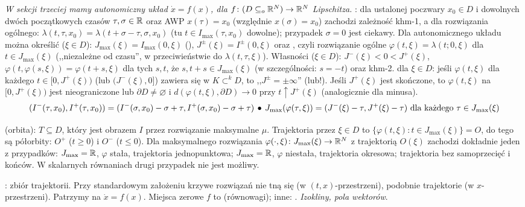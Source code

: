 \emph{W sekcji  trzeciej mamy autonomiczny układ $\dot x = f(x)$, dla $f \colon (D \subseteq_o \mathbb{R}^N) \to \mathbb{R}^N$ Lipschitza.}
: dla ustalonej poczwary $x_0 \in D$ i dowolnych dwóch początkowych czasów $\tau, \sigma \in \mathbb{R}$ oraz AWP $x(\tau) = x_0$ (względnie $x(\sigma) = x_0$) zachodzi zależność khm-1, a dla rozwiązania ogólnego: $\lambda(t, \tau, x_0) = \lambda(t+ \sigma- \tau, \sigma, x_0)$ (tu $t \in I_{\max}(\tau, x_0)$ dowolne); przypadek $\sigma = 0$ jest ciekawy.
Dla autonomicznego układu można określić ($\xi \in D$): $J_{\max}(\xi) = I_{\max}(0, \xi)$ (), $J^\pm(\xi) = I^\pm(0,\xi)$ oraz , czyli rozwiązanie ogólne $\varphi(t, \xi) = \lambda(t; 0, \xi)$ dla $t \in J_{\max}(\xi)$ (,,niezależne od czasu'', w przeciwieństwie do  $\lambda(t, \tau, \xi)$).
Własności ($\xi \in D$): $J^-(\xi) < 0 < J^+(\xi)$, $\varphi(t, \varphi(s, \xi)) = \varphi(t+s, \xi)$ dla tych $s, t$, że $s, t+s \in J_{\max}(\xi)$ (w szczególności: $s = -t$) oraz khm-2.
 dla $\xi \in D$:
jeśli $\varphi(t, \xi)$ dla każdego $t\in [0, J^+(\xi))$ (lub $(J^-(\xi), 0]$) zawiera się w $K \subset^k D$, to ,,$J^\pm=\pm \infty$'' (lub!).
Jeśli $J^+(\xi)$ jest skończone, to $\varphi(t, \xi)$ na $[0, J^+(\xi))$ jest nieograniczone lub $\partial D \neq \varnothing$ i $d(\varphi(t, \xi), \partial D) \to 0$ przy $t \uparrow J^+(\xi)$ (analogicznie dla minusa).
\[
	(I^-(\tau, x_0), I^+(\tau, x_0)) = (I^-(\sigma, x_0) - \sigma+\tau, I^+(\sigma, x_0)-  \sigma + \tau) \, \bullet \,
	J_{\max}(\varphi(\tau, \xi)) = (J^-(\xi) - \tau, J^+(\xi) - \tau) \textrm{ dla każdego } \tau \in J_{\max}(\xi)
\]

 (orbita):  $T \subseteq D$, który jest obrazem $I$ przez rozwiązanie maksymalne $\mu$.
Trajektoria przez $\xi \in D$ to $\{\varphi(t, \xi) : t \in J_{\max} (\xi)\} = O$, do tego są półorbity: $O^+$ ($t \ge 0$) i $O^-$ ($t \le 0$).
Dla maksymalnego rozwiązania $\varphi(\cdot, \xi) \colon J_{\max}(\xi) \to \mathbb{R}^N$ z trajektorią $O(\xi)$ zachodzi dokładnie jeden z przypadków: $J_{\max} = \mathbb{R}$, $\varphi$ stała, trajektoria jednopunktowa; $J_{\max} = \mathbb{R}$, $\varphi$ niestała, trajektoria okresowa; trajektoria bez samoprzecięć i końców.
W skalarnych równaniach drugi przypadek nie jest możliwy.

:   zbiór trajektorii.
Przy standardowym założeniu krzywe rozwiązań nie tną się (w $(t,x)$-przestrzeni), podobnie trajektorie (w $x$-przestrzeni).
Patrzymy na $\dot x = f(x)$.
Miejsca zerowe $f$ to  (równowagi); inne: .
\emph{Izokliny, pola wektorów}.

